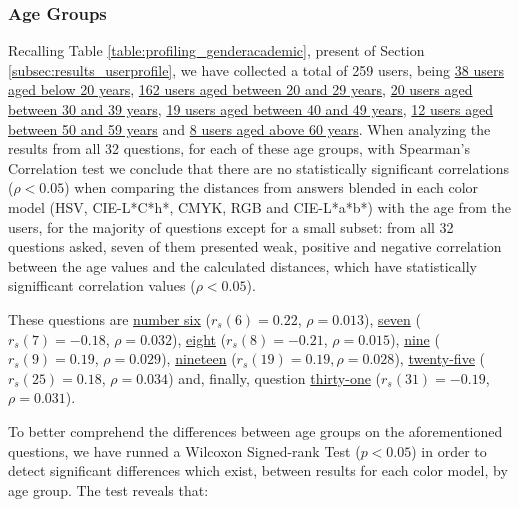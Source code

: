 \subsubsection{Age Groups}
\label{subsubsec:demo_age}
%
Recalling Table \ref{table:profiling_genderacademic}, present of Section \ref{subsec:results_userprofile}, we have collected a total of 259 users, being \ul{38 users aged below 20 years}, \ul{162 users aged between 20 and 29 years}, \ul{20 users aged between 30 and 39 years},
\ul{19 users aged between 40 and 49 years}, \ul{12 users aged between 50 and 59 years} and \ul{8 users aged above 60 years}. When analyzing the results from all 32 questions, for each of these age groups, with Spearman's Correlation test we conclude that there are no statistically
significant correlations ($\rho < 0.05$) when comparing the distances from answers blended in each color model (HSV, CIE-L*C*h*, CMYK, RGB and CIE-L*a*b*) with the age from the users, for the majority of questions except for a small subset: from all 32 questions asked, seven of them presented weak,
positive and negative correlation between the age values and the calculated distances, which have statistically signifficant correlation values ($\rho < 0.05$). \par
%
These questions are \ul{number six} ($r_s(6) = 0.22$, $\rho = 0.013$), \ul{seven} ($r_s(7) = -0.18$, $\rho = 0.032$), \ul{eight} ($r_s(8) = -0.21$, $\rho = 0.015$), \ul{nine} ($r_s(9) = 0.19$, $\rho = 0.029$), \ul{nineteen} ($r_s(19) = 0.19, \rho = 0.028$), \ul{twenty-five}
($r_s(25) = 0.18$, $\rho = 0.034$) and, finally, question \ul{thirty-one} ($r_s(31) = -0.19$, $\rho = 0.031$). \par
%
To better comprehend the differences between age groups on the aforementioned questions, we have runned a Wilcoxon Signed-rank Test ($p < 0.05$) in order to detect significant differences which exist, between results for each color model, by age group. The test reveals that:
%
